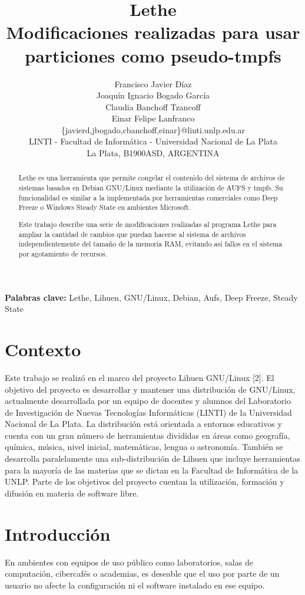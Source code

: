 \documentclass[final,narroweqnarray,inline,twoside]{ieee}
\author{Francisco Javier Díaz \\Joaquín Ignacio Bogado García \\
Claudia Banchoff Tzancoff\\Einar Felipe Lanfranco \\ \{javierd,jbogado,cbanchoff,einar\}@linti.unlp.edu.ar
\\LINTI - Facultad de Informática - Universidad Nacional de La Plata
\\La Plata, B1900ASD, ARGENTINA}
\title{Lethe\\Modificaciones realizadas para usar particiones como pseudo-tmpfs}
\newcommand{\itref}[1]{[{#1}]}
\begin{document}
\maketitle
\sloppy

\begin{abstract}
\noindent Lethe es una herramienta que permite congelar el contenido del sistema de archivos de sistemas basados en Debian
GNU/Linux mediante la utilización de AUFS y tmpfs. Su funcionalidad es similar a la implementada por herramientas comerciales
como Deep Freeze o Windows Steady State en ambientes Microsoft.

Este trabajo describe una serie de modificaciones realizadas al programa Lethe para ampliar la cantidad de cambios
que puedan hacerse al sistema de archivos independientemente del tamaño de la memoria RAM, evitando así fallos en
el sistema por agotamiento de recursos.
\end{abstract}

\noindent \textbf{Palabras clave: } Lethe, Lihuen, GNU/Linux, Debian, Aufs, Deep Freeze, Steady State

\section{Contexto}
Este trabajo se realizó en el marco del proyecto Lihuen GNU/Linux \itref{2}. El objetivo del proyecto es desarrollar y
mantener una distribución de GNU/Linux, actualmente desarrollada por un equipo de docentes y alumnos del Laboratorio de
Investigación de Nuevas Tecnologías Informáticas (LINTI) de la Universidad Nacional de La Plata. La distribución está
orientada a entornos educativos y cuenta con un gran número de herramientas divididas en áreas como geografía, química,
música, nivel inicial, matemáticas, lengua o astronomía. También se desarrolla paralelamente una sub-distribución de Lihuen
que incluye herramientas para la mayoría de las materias que se dictan en la Facultad de Informática de la UNLP. Parte de los
objetivos del proyecto cuentan la utilización, formación y difusión en materia de software libre. 

\section{Introducción}
En ambientes con equipos de uso público como laboratorios, salas de computación, cibercafés o academias, es deseable que el
uso por parte de un usuario no afecte la configuración ni el software instalado en ese equipo.
\end{document}
